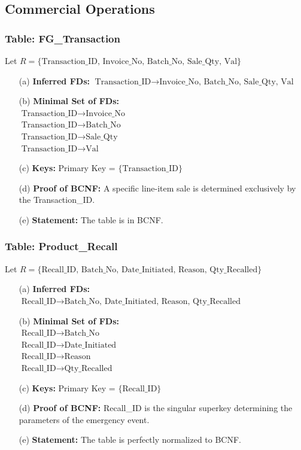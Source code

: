 \documentclass[12pt, a4paper]{article}
\begin{document}
\subsection{Commercial Operations}

\subsubsection{Table: FG\_Transaction}
Let $R = \{ \text{Transaction\_ID, Invoice\_No, Batch\_No, Sale\_Qty, Val} \}$
\begin{enumerate}
    \item[(a)] \textbf{Inferred FDs:} $\text{Transaction\_ID} \rightarrow \text{Invoice\_No, Batch\_No, Sale\_Qty, Val}$
    \item[(b)] \textbf{Minimal Set of FDs:} 
    \\ $\text{Transaction\_ID} \rightarrow \text{Invoice\_No}$
    \\ $\text{Transaction\_ID} \rightarrow \text{Batch\_No}$
    \\ $\text{Transaction\_ID} \rightarrow \text{Sale\_Qty}$
    \\ $\text{Transaction\_ID} \rightarrow \text{Val}$
    \item[(c)] \textbf{Keys:} Primary Key = $\{ \text{Transaction\_ID} \}$
    \item[(d)] \textbf{Proof of BCNF:} A specific line-item sale is determined exclusively by the Transaction\_ID.
    \item[(e)] \textbf{Statement:} The table is in BCNF.
\end{enumerate}

\subsubsection{Table: Product\_Recall}
Let $R = \{ \text{Recall\_ID, Batch\_No, Date\_Initiated, Reason, Qty\_Recalled} \}$
\begin{enumerate}
    \item[(a)] \textbf{Inferred FDs:} $\text{Recall\_ID} \rightarrow \text{Batch\_No, Date\_Initiated, Reason, Qty\_Recalled}$
    \item[(b)] \textbf{Minimal Set of FDs:} 
    \\ $\text{Recall\_ID} \rightarrow \text{Batch\_No}$
    \\ $\text{Recall\_ID} \rightarrow \text{Date\_Initiated}$
    \\ $\text{Recall\_ID} \rightarrow \text{Reason}$
    \\ $\text{Recall\_ID} \rightarrow \text{Qty\_Recalled}$
    \item[(c)] \textbf{Keys:} Primary Key = $\{ \text{Recall\_ID} \}$
    \item[(d)] \textbf{Proof of BCNF:} Recall\_ID is the singular superkey determining the parameters of the emergency event.
    \item[(e)] \textbf{Statement:} The table is perfectly normalized to BCNF.
\end{enumerate}
\end{document}
